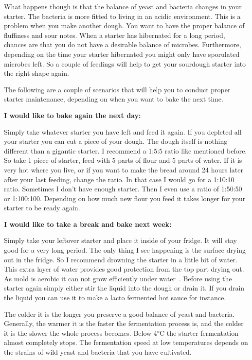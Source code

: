 What happens though is that the balance of yeast and
bacteria changes in your starter. The bacteria is more fitted to living
in an acidic environment. This is a problem when you make another dough.
You want to have the proper balance of fluffiness and sour notes.
When a starter has hibernated for a long period, chances are that
you do not have a desirable balance of microbes.
Furthermore, depending on the time your starter hibernated you might only have
sporulated microbes left. So a couple of feedings will help to get your
sourdough starter into the right shape again.

The following are a couple of scenarios that will help you to conduct proper
starter maintenance, depending on when you want to bake the next time.

\textbf{I would like to bake again the next day:}

Simply take whatever starter you have left and feed it again. If you depleted
all your starter you can cut a piece of your dough. The dough itself is
nothing different than a gigantic starter. I recommend a 1:5:5 ratio like
mentioned before. So take 1 piece of starter, feed with 5 parts of flour and 5
parts of water. If it is very hot where you live, or if you want to make the
bread around 24 hours later after your last feeding, change the ratio. In that
case I would go for a 1:10:10 ratio. Sometimes I don't have enough starter.
Then I even use a ratio of 1:50:50 or 1:100:100. Depending on how much new
flour you feed it takes longer for your starter to be ready again.

\textbf{I would like to take a break and bake next week:}

Simply take your leftover starter and place it inside of your fridge. It will stay good
for a very long period. The only thing I see happening is the surface
drying out in the fridge. So I recommend drowning the starter in a little bit
of water. This extra layer of water provides good protection from the top
part drying out. As mold is aerobic it can not grow efficiently under
water~\cite{mold+anaerobic}. Before using the starter again simply either stir
the liquid into the dough or drain it. If you drain the liquid you can use it
to make a lacto fermented hot sauce for instance.

The colder it is the longer you preserve a good balance of yeast and
bacteria. Generally, the warmer it is the faster the fermentation process is,
and the colder it is the slower the whole process becomes.
Below 4°C the starter fermentation almost completely stops. The
fermentation speed at low temperatures depends on the
strains of wild yeast and bacteria
that you have cultivated.

